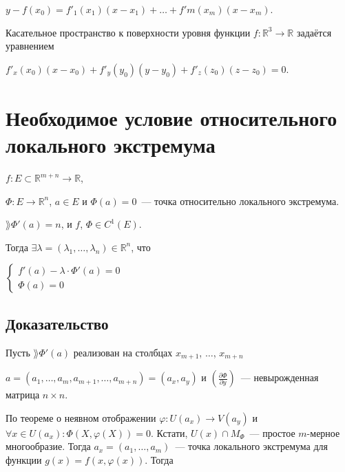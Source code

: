 \documentclass{article}
\begin{document}
        $y - f(x_0) = f'_1(x_1) (x - x_1) + \ldots + f'm(x_m)(x - x_m)$.
        
        Касательное пространство к поверхности уровня функции $f : \mathbb{R}^3 \rightarrow \mathbb{R}$ задаётся уравнением
        
        $f'_x(x_0)(x - x_0) + f'_y(y_0)(y - y_0) + f'_z(z_0)(z - z_0) = 0$.
        
    \newpage
    
    \section{Необходимое условие относительного локального экстремума}
    
        $f : E \subset \mathbb{R}^{m + n} \rightarrow \mathbb{R}$,
        
        $\Phi : E \rightarrow \mathbb{R}^n$, $a \in E$ и $\Phi(a) = 0$~--- точка относительно локального экстремума.
        
        $\rang \Phi'(a) = n$, и $f$, $\Phi \in C^1 \left( E \right)$.
        
        Тогда $\exists \lambda = (\lambda_1, \ldots, \lambda_n) \in \mathbb{R}^n$, что
        
        $
            \begin{cases}
            
                f'(a) - \lambda \cdot \Phi'(a) = 0 \\
                
                \Phi(a) = 0
                
            \end{cases}
        $
        
        \subsection{Доказательство}
        
            Пусть $\rang \Phi'(a)$ реализован на столбцах $x_{m + 1}$, $\ldots$, $x_{m + n}$
            
            $a = (a_1, \ldots, a_m, a_{m + 1}, \ldots, a_{m + n}) = (a_x, a_y)$ и $\left( \frac{\partial \Phi}{\partial y} \right)$~--- невырожденная матрица $n \times n$.
            
            По теореме о неявном отображении $\varphi : U(a_x) \rightarrow V(a_y)$ и $\forall x \in U(a_x) : \Phi (X, \varphi(X) ) = 0$. Кстати, $U(x) \cap M_{\Phi}$~--- простое $m$-мерное многообразие. Тогда $a_x = (a_1, \ldots, a_m)$~--- точка локального экстремума для функции $g(x) = f(x, \varphi(x))$. Тогда
            
\end{document}
